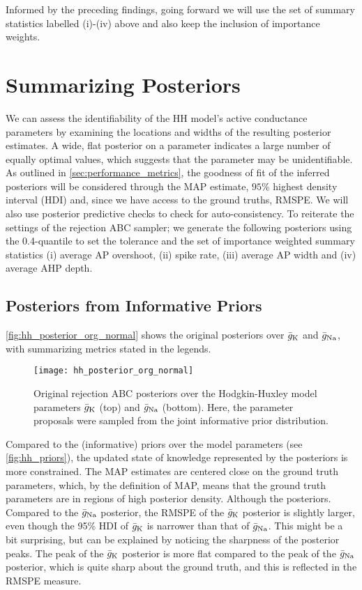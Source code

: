 Informed by the preceding findings, going forward we will use the set of summary statistics labelled (i)-(iv) above and also keep the inclusion of importance weights.


\section{Summarizing Posteriors}

We can assess the identifiability of the HH model's active conductance parameters by examining the locations and widths of the resulting posterior estimates. A wide, flat posterior on a parameter indicates a large number of equally optimal values, which suggests that the parameter may be unidentifiable. As outlined in \cref{sec:performance_metrics}, the goodness of fit of the inferred posteriors will be considered through the MAP estimate, $95\%$ highest density interval (HDI) and, since we have access to the ground truths, RMSPE. We will also use posterior predictive checks to check for auto-consistency. To reiterate the settings of the rejection ABC sampler; we generate the following posteriors using the 0.4-quantile to set the tolerance and the set of importance weighted summary statistics (i) average AP overshoot, (ii) spike rate, (iii) average AP width and (iv) average AHP depth.

\subsection{Posteriors from Informative Priors}

\autoref{fig:hh_posterior_org_normal} shows the original posteriors over $\bar{g}_{\mathrm{K}}$ and $\bar{g}_{\mathrm{Na}}$, with summarizing metrics stated in the legends.
\begin{figure}[H]
    \centering
    \texttt{[image: hh\_posterior\_org\_normal]}
    \caption{Original rejection ABC posteriors over the Hodgkin-Huxley model parameters $\bar{g}_{\mathrm{K}}$ (top) and $\bar{g}_{\mathrm{Na}}$ (bottom). Here, the parameter proposals were sampled from the joint informative prior distribution. }
    \label{fig:hh_posterior_org_normal}
\end{figure}
Compared to the (informative) priors over the model parameters (see \autoref{fig:hh_priors}), the updated state of knowledge represented by the posteriors is more constrained. The MAP estimates are centered close on the ground truth parameters, which, by the definition of MAP, means that the ground truth parameters are in regions of high posterior density. Although the posteriors. Compared to the $\bar{g}_{\mathrm{Na}}$ posterior, the RMSPE of the $\bar{g}_{\mathrm{K}}$ posterior is slightly larger, even though the 95\% HDI of $\bar{g}_{\mathrm{K}}$ is narrower than that of $\bar{g}_{\mathrm{Na}}$. This might be a bit surprising, but can be explained by noticing the sharpness of the posterior peaks. The peak of the $\bar{g}_{\mathrm{K}}$ posterior is more flat compared to the peak of the $\bar{g}_{\mathrm{Na}}$ posterior, which is quite sharp about the ground truth, and this is reflected in the RMSPE measure.





